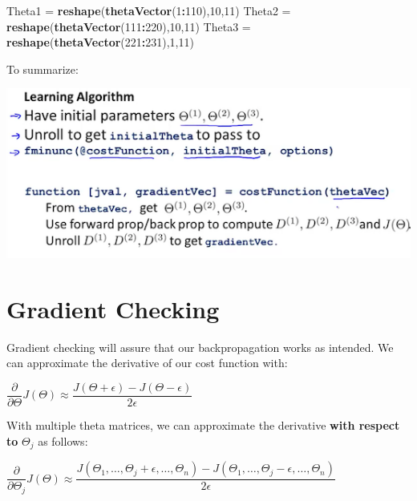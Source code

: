 \documentclass[
]{book}
\newenvironment{Shaded}{\begin{snugshade}}{\end{snugshade}}
\newcommand{\DecValTok}[1]{\textcolor[rgb]{0.00,0.00,0.81}{#1}}
\newcommand{\KeywordTok}[1]{\textcolor[rgb]{0.13,0.29,0.53}{\textbf{#1}}}
\newcommand{\NormalTok}[1]{#1}
\newcommand{\OperatorTok}[1]{\textcolor[rgb]{0.81,0.36,0.00}{\textbf{#1}}}
\newcommand{\StringTok}[1]{\textcolor[rgb]{0.31,0.60,0.02}{#1}}
\begin{document}
\begin{Shaded}
\begin{Highlighting}[]
\NormalTok{Theta1 =}\StringTok{ }\KeywordTok{reshape}\NormalTok{(}\KeywordTok{thetaVector}\NormalTok{(}\DecValTok{1}\OperatorTok{:}\DecValTok{110}\NormalTok{),}\DecValTok{10}\NormalTok{,}\DecValTok{11}\NormalTok{)}
\NormalTok{Theta2 =}\StringTok{ }\KeywordTok{reshape}\NormalTok{(}\KeywordTok{thetaVector}\NormalTok{(}\DecValTok{111}\OperatorTok{:}\DecValTok{220}\NormalTok{),}\DecValTok{10}\NormalTok{,}\DecValTok{11}\NormalTok{)}
\NormalTok{Theta3 =}\StringTok{ }\KeywordTok{reshape}\NormalTok{(}\KeywordTok{thetaVector}\NormalTok{(}\DecValTok{221}\OperatorTok{:}\DecValTok{231}\NormalTok{),}\DecValTok{1}\NormalTok{,}\DecValTok{11}\NormalTok{)}
\end{Highlighting}
\end{Shaded}

To summarize:

\includegraphics{unrollingParameters.png}

\hypertarget{gradient-checking}{%
\section{Gradient Checking}\label{gradient-checking}}

Gradient checking will assure that our backpropagation works as intended. We can approximate the derivative of our cost function with:

\(\dfrac{\partial}{\partial\Theta}J(\Theta) \approx \dfrac{J(\Theta + \epsilon) - J(\Theta - \epsilon)}{2\epsilon}\)

With multiple theta matrices, we can approximate the derivative \textbf{with respect to} \(Θ_j\) as follows:

\(\dfrac{\partial}{\partial\Theta_j}J(\Theta) \approx \dfrac{J(\Theta_1, \dots, \Theta_j + \epsilon, \dots, \Theta_n) - J(\Theta_1, \dots, \Theta_j - \epsilon, \dots, \Theta_n)}{2\epsilon}\)
\end{document}
